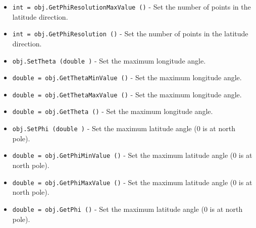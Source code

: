 \begin{itemize}
\item  \verb|int = obj.GetPhiResolutionMaxValue ()| -  Set the number of points in the latitude direction.

\item  \verb|int = obj.GetPhiResolution ()| -  Set the number of points in the latitude direction.

\item  \verb|obj.SetTheta (double )| -  Set the maximum longitude angle.

\item  \verb|double = obj.GetThetaMinValue ()| -  Set the maximum longitude angle.

\item  \verb|double = obj.GetThetaMaxValue ()| -  Set the maximum longitude angle.

\item  \verb|double = obj.GetTheta ()| -  Set the maximum longitude angle.

\item  \verb|obj.SetPhi (double )| -  Set the maximum latitude angle (0 is at north pole).

\item  \verb|double = obj.GetPhiMinValue ()| -  Set the maximum latitude angle (0 is at north pole).

\item  \verb|double = obj.GetPhiMaxValue ()| -  Set the maximum latitude angle (0 is at north pole).

\item  \verb|double = obj.GetPhi ()| -  Set the maximum latitude angle (0 is at north pole).

\end{itemize}

